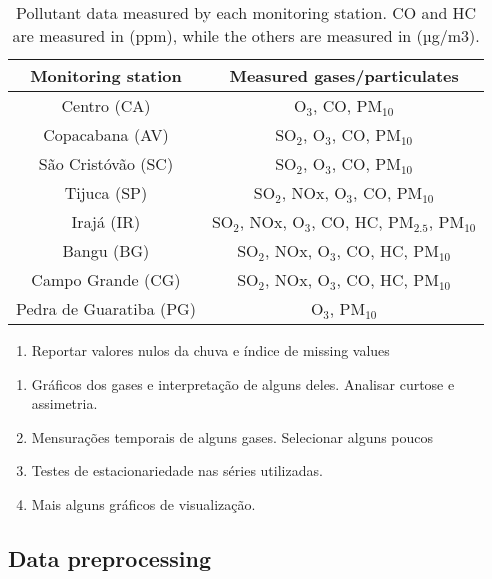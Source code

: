 \begin{table*}[b]
    \centering
    \begin{tabular}{|c|c|}
    \hline
    \textbf{Monitoring station}        & \textbf{Measured gases/particulates}              \\ \hline
    Centro (CA)             & O$_3$, CO, PM$_{10}$                              \\ \hline
    Copacabana (AV)         & SO$_2$, O$_3$, CO, PM$_{10}$                      \\ \hline
    São Cristóvão (SC)      & SO$_2$, O$_3$, CO, PM$_{10}$                      \\ \hline
    Tijuca (SP)             & SO$_2$, NOx, O$_3$, CO, PM$_{10}$                 \\ \hline
    Irajá (IR)              & SO$_2$, NOx, O$_3$, CO, HC, PM$_{2.5}$, PM$_{10}$ \\ \hline
    Bangu (BG)              & SO$_2$, NOx, O$_3$, CO, HC, PM$_{10}$             \\ \hline
    Campo Grande (CG)       & SO$_2$, NOx, O$_3$, CO, HC, PM$_{10}$             \\ \hline
    Pedra de Guaratiba (PG) & O$_3$, PM$_{10}$                                  \\ \hline
    \end{tabular}
    \caption{Pollutant data measured by each monitoring station. CO and HC are measured in (ppm), while the others are measured in (µg/m3).}
    \label{tab:pollutants-measured}
\end{table*}

\begin{enumerate}
    \item Reportar valores nulos da chuva e índice de missing values
\end{enumerate}

\begin{enumerate}
    \item Gráficos dos gases e interpretação de alguns deles. Analisar curtose
    e assimetria.
    \item Mensurações temporais de alguns gases. Selecionar alguns poucos
    \item Testes de estacionariedade nas séries utilizadas. 
    \item Mais alguns gráficos de visualização. 
\end{enumerate}

\subsection{Data preprocessing}

